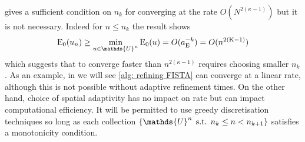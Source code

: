 \documentclass[10pt,a4paper,onecolumn]{article}
\numberwithin{equation}{section}
\let\F\mathds\let\C\mathcal\newcommand{\R}{\F{R}}\newcommand{\A}{\C{A}}
\newcommand{\op}[1]{\operatorname{#1}}\newcommand{\overtext}[2]{\stackrel{\text{#1}}{#2}}
\DeclareMathOperator{\st}{\;s.t.\;}\DeclareMathOperator{\as}{\;a.s.\;}\renewcommand{\epsilon}{\varepsilon}
\newcommand*{\Func}[1]{%
	\IfEqCase{#1}{%
		{0}{\op{E}}%
		{1}{\op{F}}%
		{2}{\op{G}}%
		{3}{\op{H}}%
	}[\op{F}#1]%
}
\newcommand*{\varf}[1]{%
	\IfEqCase{#1}{%
		{0}{u}%
		{1}{v}%
		{2}{w}%
	}[u#1]%
}
\newcommand*{\spcf}[1]{%
	\IfEqCase{#1}{%
		{0}{\F{U}}%
		{1}{\F{V}}%
		{2}{\F{W}}%
	}[\F{U}#1]%
}
\newcommand*{\vars}[1]{%
	\IfEqCase{#1}{%
		{0}{\alpha}%
		{1}{\beta}%
		{2}{\gamma}%
		{3}{a}%
		{4}{b}%
		{5}{c}%
	}[k#1]%
}
\begin{document}
 gives a sufficient condition on $n_k$ for converging at the rate $O(N^{2(\kappa-1)})$ but it is not necessary. Indeed for $n\leq n_k$ the result shows 
$$\Func0_0(\varf0_n) \geq \min_{\varf0\in\spcf0^n}\Func0_0(\varf0) = O(\vars3_{\Func0}^{-k}) = O(n^{2(\kappa-1)})$$
which suggests that to converge faster than $n^{2(\kappa-1)}$ requires choosing smaller $n_k$. As an example, in  we will see \cref{alg: refining FISTA} can converge at a linear rate, although this is not possible without adaptive refinement times. On the other hand, choice of spatial adaptivity has no impact on rate but can impact computational efficiency. It will be permitted to use greedy discretisation techniques so long as each collection $\{\spcf0^n \st n_k\leq n<n_{k+1}\}$ satisfies a monotonicity condition.
\end{document}
